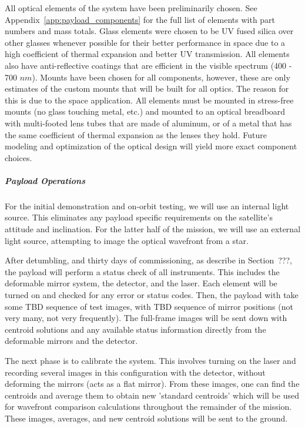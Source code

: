 \documentclass[12pt]{article}
\begin{document}
All optical elements of the system have been preliminarily chosen.  See Appendix~\ref{app:payload_components} for the full list of elements with part numbers and mass totals.  Glass elements were chosen to be UV fused silica over other glasses whenever possible for their better performance in space \cite{radiation_optics} due to a high coefficient of thermal expansion and better UV transmission.  All elements also have anti-reflective coatings that are efficient in the visible spectrum (400 - 700 $nm$).  Mounts have been chosen for all components, however, these are only estimates of the custom mounts that will be built for all optics.  The reason for this is due to the space application.  All elements must be mounted in stress-free mounts (no glass touching metal, etc.) and mounted to an optical breadboard with multi-footed lens tubes that are made of aluminum, or of a metal that has the same coefficient of thermal expansion as the lenses they hold.  Future modeling and optimization of the optical design will yield more exact component choices.

\subparagraph{Payload Operations}
For the initial demonstration and on-orbit testing, we will use an internal light source. This eliminates any payload specific requirements on the satellite's attitude and inclination. For the latter half of the mission, we will use an external light source, attempting to image the optical wavefront from a star.

After detumbling, and thirty days of commissioning, as describe in Section~???, the payload will perform a status check of all instruments. This includes the deformable mirror system, the detector, and the laser. Each element will be turned on and checked for any error or status codes. Then, the payload with take some TBD sequence of test images, with TBD sequence of mirror positions (not very many, not very frequently). The full-frame images will be sent down with centroid solutions and any available status information directly from the deformable mirrors and the detector.

The next phase is to calibrate the system. This involves turning on the laser and recording several images in this configuration with the detector, without deforming the mirrors (acts as a flat mirror). From these images, one can find the centroids and average them to obtain new 'standard centroids' which will be used for wavefront comparison calculations throughout the remainder of the mission. These images, averages, and new centroid solutions will be sent to the ground.
\end{document}
